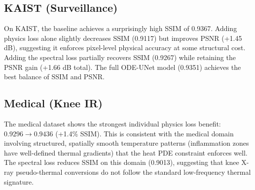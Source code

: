 \begin{table}[htbp]
\centering
\caption{Summary of domain-specific qualitative and quantitative impacts of the loss constraints.}
\label{tab:domain_analysis}
\end{table}

\subsection{KAIST (Surveillance)}

On KAIST, the baseline achieves a surprisingly high SSIM of 0.9367. Adding physics loss alone slightly decreases SSIM (0.9117) but improves PSNR (+1.45 dB), suggesting it enforces pixel-level physical accuracy at some structural cost. Adding the spectral loss partially recovers SSIM (0.9267) while retaining the PSNR gain (+1.66 dB total). The full ODE-UNet model (0.9351) achieves the best balance of SSIM and PSNR.

\subsection{Medical (Knee IR)}

The medical dataset shows the strongest individual physics loss benefit: $0.9296 \to 0.9436$ (+1.4\% SSIM). This is consistent with the medical domain involving structured, spatially smooth temperature patterns (inflammation zones have well-defined thermal gradients) that the heat PDE constraint enforces well. The spectral loss reduces SSIM on this domain (0.9013), suggesting that knee X-ray pseudo-thermal conversions do not follow the standard low-frequency thermal signature.

